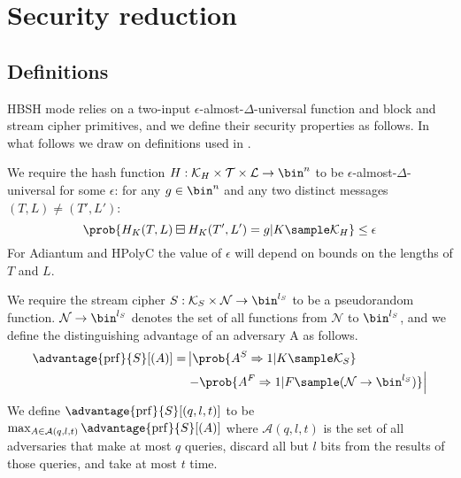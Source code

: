 \documentclass[eprint.tex]{subfiles}
\begin{document}
\section{Security reduction}
\subsection{Definitions}
HBSH mode relies on a two-input $\epsilon$-almost-$\Delta$-universal function and
block and stream cipher primitives, and we define their security properties
as follows. In what follows we draw on definitions used in \cite{hctr2}.

We require the hash function
$H: \mathcal{K}_H \times \mathcal{T} \times \mathcal{L} \rightarrow \bin^n$
to be $\epsilon$-almost-$\Delta$-universal for some $\epsilon$:
for any $g \in \bin^n$ and
any two distinct messages $(T, L) \neq (T', L')$:
%
\begin{displaymath}
\prob{H_{K}(T, L) \boxminus H_{K}(T', L') = g | K \sample \mathcal{K}_H} \leq \epsilon
\end{displaymath}
%
For Adiantum and HPolyC the value of $\epsilon$ will depend on bounds on the lengths of $T$ and $L$.

We require the stream cipher
$S: \mathcal{K}_S \times \mathcal{N} \rightarrow \bin^{l_S}$
to be a pseudorandom function. $\mathcal{N} \rightarrow \bin^{l_S}$ denotes the set of all
functions from $\mathcal{N}$ to $\bin^{l_S}$, and we
define the distinguishing advantage of an adversary A as follows.
%
\begin{displaymath}
    \begin{aligned}
        \advantage{\mathrm{prf}}{S}[(A)] =
        &\left| \prob{A^S\Rightarrow 1 | K \sample \mathcal{K}_S}\right.
        \\
        &\left. - \prob{A^F\Rightarrow 1
        | F \sample (\mathcal{N} \rightarrow \bin^{l_S})} \right|
    \end{aligned}
\end{displaymath}
%
We define $\advantage{\mathrm{prf}}{S}[(q, l, t)]$ to be
$\max_{A \in \mathcal{A}(q, l, t)} \advantage{\mathrm{prf}}{S}[(A)]$ where $\mathcal{A}(q, l, t)$
is the set of all adversaries that make at most $q$ queries, discard all but $l$ bits from
the results of those queries, and take at most $t$ time.
\end{document}
